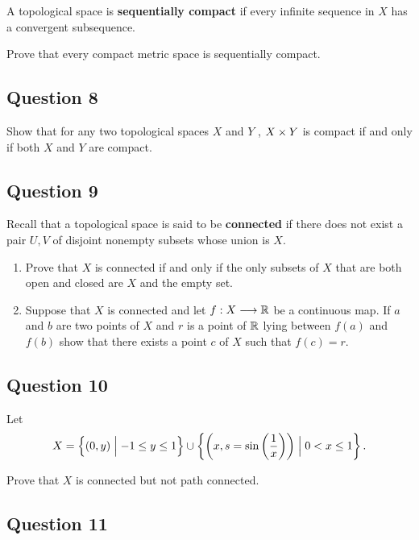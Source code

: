 \documentclass[12pt]{article}
\newcommand{\qty}[1]{\left( {#1} \right)}
\begin{document}
A topological space is \textbf{sequentially compact} if every infinite
sequence in \(X\) has a convergent subsequence.

Prove that every compact metric space is sequentially compact.

\hypertarget{question-8-3}{%
\subsection{Question 8}\label{question-8-3}}

Show that for any two topological spaces \(X\) and \(Y\) ,
\(X \times Y\) is compact if and only if both \(X\) and \(Y\) are
compact.

\hypertarget{question-9-3}{%
\subsection{Question 9}\label{question-9-3}}

Recall that a topological space is said to be \textbf{connected} if
there does not exist a pair \(U, V\) of disjoint nonempty subsets whose
union is \(X\).

\begin{enumerate}
\def\labelenumi{\roman{enumi}.}
\item
  Prove that \(X\) is connected if and only if the only subsets of \(X\)
  that are both open and closed are \(X\) and the empty set.
\item
  Suppose that \(X\) is connected and let \(f : X \longrightarrow {\mathbb{R}}\) be a
  continuous map. If \(a\) and \(b\) are two points of \(X\) and \(r\)
  is a point of \({\mathbb{R}}\) lying between \(f (a)\) and \(f (b)\) show that
  there exists a point \(c\) of \(X\) such that \(f (c) = r\).
\end{enumerate}

\hypertarget{question-10-3}{%
\subsection{Question 10}\label{question-10-3}}

Let \[
X = \theset{(0, y) \mid - 1 \leq y \leq 1} \cup \theset{\qty{x, s = \sin\qty{1 \over x}} \mid 0 < x \leq 1}
.\]

Prove that \(X\) is connected but not path connected.

\hypertarget{question-11-3}{%
\subsection{Question 11}\label{question-11-3}}
\end{document}
